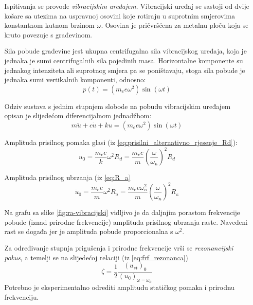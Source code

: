 
Ispitivanja se provode \textit{vibracijskim uređajem}. Vibracijski uređaj se sastoji
od dvije košare sa utezima na uspravnoj osovini koje rotiraju u suprotnim smjerovima
konstantnom kutnom brzinom $\omega$. Osovina je pričvršćena za metalnu ploču koja se
kruto povezuje s građevinom. 

Sila pobude građevine jest ukupna centrifugalna sila vibracijskog uređaja, koja je 
jednaka je sumi centrifugalnih sila pojedinih masa.
Horizontalne komponente su jednakog intenziteta ali suprotnog smjera pa se
poništavaju, stoga sila pobude je jednaka sumi vertikalnih komponenti, odnosno:
\begin{equation}
    p(t)=(m_ee\omega^2)\sin(\omega t)
\end{equation}

Odziv sustava s jednim stupnjem slobode na pobudu vibracijskim uređajem opisan je
slijedećom diferencijalnom jednadžbom:
\begin{equation}
    m\ddot{u}+c\dot{u}+ku=(m_ee\omega^2)\sin(\omega t)
\end{equation}

Amplituda prisilnog pomaka glasi (iz \eqref{eq:prisilni_alternativno_rjesenje_Rd}):
\begin{equation}
    u_0=\frac{m_ee}{k}\omega^2R_d = \frac{m_ee}{m}\left(\frac{\omega}{\omega_n}\right)^2R_d
\end{equation}

Amplituda prisilnog ubrzanja (iz \eqref{eq:R_a}
\begin{equation}
    \ddot{u}_0=\frac{m_ee}{m}\omega^2R_a=\frac{m_ee\omega_n^2}{m}\left(\frac{\omega}{\omega_n}\right)^2R_a
\end{equation}


Na grafu sa slike \ref{fig:ra-vibracijski} vidljivo je da daljnjim porastom frekvencije pobude (iznad prirodne
frekvencije) amplituda prisilnog ubrzanja raste. Navedeni rast se događa jer je
amplituda pobude proporcionalna s $\omega^2$. 
\par

Za određivanje stupnja prigušenja i prirodne frekvencije vrši se
\textit{rezonancijski pokus}, a temelji se na slijedećoj relaciji (iz \eqref{eq:frf_rezonanca})
\begin{equation}\label{eq:rezonancijski_pokus}
    \zeta = \frac{1}{2}\frac{(u_{st})_0}{(u_0)_{\omega=\omega_n}}
\end{equation}
Potrebno je eksperimentalno odrediti amplitudu statičkog pomaka i prirodnu frekvenciju. 


